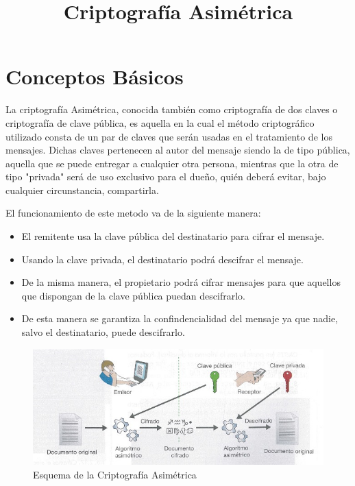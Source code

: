 \documentclass[10pt, conference]{IEEEtran}
\title{Criptografía Asimétrica}
\begin{document}
\maketitle

\section{Conceptos Básicos}

La criptografía Asimétrica, conocida también como criptografía de dos claves o criptografía de clave pública, es aquella en la cual el método criptográfico utilizado consta de un par de claves que serán usadas en el tratamiento de los mensajes. Dichas claves pertenecen al autor del mensaje siendo la de tipo pública, aquella que se puede entregar a cualquier otra persona, mientras que la otra de tipo "privada" será de uso exclusivo para el dueño, quién deberá evitar, bajo cualquier circunstancia, compartirla.

El funcionamiento de este metodo va de la siguiente manera:
\begin{itemize}
\item El remitente usa la clave pública del destinatario para cifrar el mensaje.
\item Usando la clave privada, el destinatario podrá descifrar el mensaje.

\item De la misma manera, el propietario podrá cifrar mensajes para que aquellos que dispongan de la clave pública puedan descifrarlo.

\item De esta manera se garantiza la confindencialidad del mensaje ya que nadie, salvo el destinatario, puede descifrarlo.

\end{itemize}

\begin{figure}[h]
\begin{center}
\includegraphics[scale=0.60]{asimetrica.jpg} \end{center}
\caption{Esquema de la Criptografía Asimétrica}
\end{figure}
\end{document}
